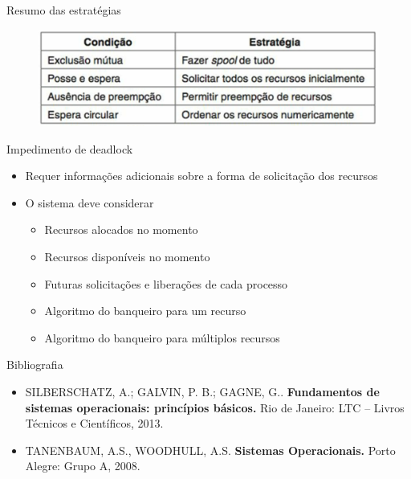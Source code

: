 \documentclass[aspectratio=169,
				xcolor=table]{beamer}
\begin{document}
	\begin{frame}{Resumo das estratégias}
		
		\begin{figure}
			\centering
			\includegraphics[keepaspectratio, height=0.7\paperheight]{../figs/cap07/estrategias.png}			
		\end{figure}
	\end{frame}
	
	\begin{frame}{Impedimento de deadlock}
		\begin{itemize}
			\item Requer informações adicionais sobre a forma de solicitação dos recursos
			\vspace{1em}
			\item O sistema deve considerar
			\begin{itemize}
				\item Recursos alocados no momento
				\item Recursos disponíveis no momento
				\item Futuras solicitações e liberações de cada processo
			\end{itemize}
			\vspace{1em}
			\begin{itemize}
				\item Algoritmo do banqueiro para um recurso
				\item Algoritmo do banqueiro para múltiplos recursos
			\end{itemize}
		\end{itemize}
	\end{frame}
	
	
	\begin{frame}{Bibliografia}
		\begin{itemize}
			\item SILBERSCHATZ, A.; GALVIN, P. B.; GAGNE, G.. \textbf{Fundamentos de sistemas operacionais: princípios básicos.} Rio de Janeiro: LTC – Livros Técnicos e Científicos, 2013.
			
			\vspace{1em}

			\item TANENBAUM, A.S., WOODHULL, A.S. \textbf{Sistemas Operacionais.} Porto Alegre: Grupo A, 2008.
			
		\end{itemize}
	\end{frame}


	\begin{frame}{}
	\end{frame}	
	
\end{document}
